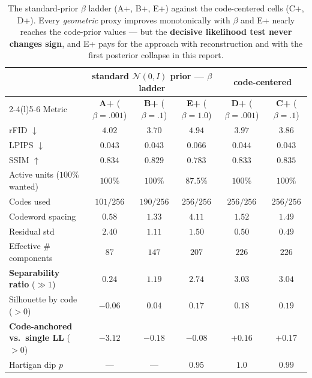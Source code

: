 \documentclass[11pt]{article}
\newcommand{\good}[1]{\textcolor{green!55!black}{#1}}
\newcommand{\bad}[1]{\textcolor{red!70!black}{#1}}
\begin{document}
\begin{table}[h]
\centering
\caption{The standard-prior $\beta$ ladder (A+, B+, E+) against the code-centered cells (C+, D+).
Every \emph{geometric} proxy improves monotonically with $\beta$ and E+ nearly reaches the
code-prior values --- but the \textbf{decisive likelihood test never changes sign}, and E+ pays for
the approach with reconstruction and with the first posterior collapse in this report.}
\label{tab:betaceiling}
\small
\begin{tabular}{lccc cc}
\toprule
 & \multicolumn{3}{c}{standard $\mathcal{N}(0,I)$ prior --- $\beta$ ladder} & \multicolumn{2}{c}{code-centered}\\
\cmidrule(r){2-4}\cmidrule(l){5-6}
Metric & \textbf{A+} ($\beta{=}.001$) & \textbf{B+} ($\beta{=}.1$) & \textbf{E+} ($\beta{=}1.0$) & \textbf{D+} ($\beta{=}.001$) & \textbf{C+} ($\beta{=}.1$)\\
\midrule
rFID $\downarrow$              & \good{$4.02$} & \good{$3.70$} & \bad{$4.94$} & \good{$3.97$} & \good{$3.86$}\\
LPIPS $\downarrow$             & \good{$0.043$} & \good{$0.043$} & \bad{$0.066$} & \good{$0.044$} & \good{$0.043$}\\
SSIM $\uparrow$                & $0.834$ & $0.829$ & \bad{$0.783$} & $0.833$ & $0.835$\\
\midrule
Active units ($100\%$ wanted)  & \good{$100\%$} & \good{$100\%$} & \bad{$87.5\%$} & \good{$100\%$} & \good{$100\%$}\\
Codes used                     & \bad{$101/256$} & $190/256$ & \good{$256/256$} & \good{$256/256$} & \good{$256/256$}\\
Codeword spacing               & $0.58$ & $1.33$ & $4.11$ & $1.52$ & $1.49$\\
Residual std                   & \bad{$2.40$} & $1.11$ & $1.50$ & \good{$0.50$} & \good{$0.49$}\\
Effective \# components        & $87$ & $147$ & $207$ & $226$ & $226$\\
\midrule
\textbf{Separability ratio} ($\gg1$) & \bad{$0.24$} & \bad{$1.19$} & $2.74$ & \good{$3.03$} & \good{$3.04$}\\
Silhouette by code ($>0$)      & \bad{$-0.06$} & $0.04$ & $0.17$ & \good{$0.18$} & \good{$0.19$}\\
\textbf{Code-anchored vs.\ single LL} ($>0$) & \bad{$-3.12$} & \bad{$-0.18$} & \bad{$-0.08$} & \good{$+0.16$} & \good{$+0.17$}\\
Hartigan dip $p$               & --- & --- & $0.95$ & $1.0$ & $0.99$\\
\bottomrule
\end{tabular}
\end{table}
\end{document}
